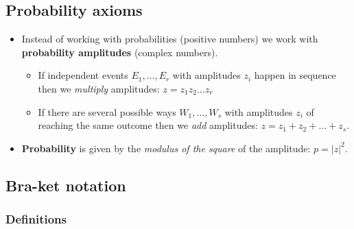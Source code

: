 \documentclass[10pt]{article}
\begin{document}
        \subsection{Probability axioms}

            \begin{itemize}
                \item Instead of working with probabilities (positive numbers) we work with \textbf{probability amplitudes} (complex numbers).
                    \begin{itemize}
                        \item If independent events $E_1,\ldots,E_r$ with amplitudes $z_i$ happen in sequence then we \emph{multiply} amplitudes: $z=z_1z_2\ldots z_r$
                        \item If there are several possible ways $W_1,\ldots,W_s$ with amplitudes $z_i$ of reaching the same outcome then we \emph{add} amplitudes: $z=z_1+z_2+\ldots+z_s$.
                    \end{itemize}
                \item \textbf{Probability} is given by the \emph{modulus of the square} of the amplitude: $p=|z|^2$.
            \end{itemize}

        \subsection{Bra-ket notation}

            \subsubsection{Definitions}
\end{document}
